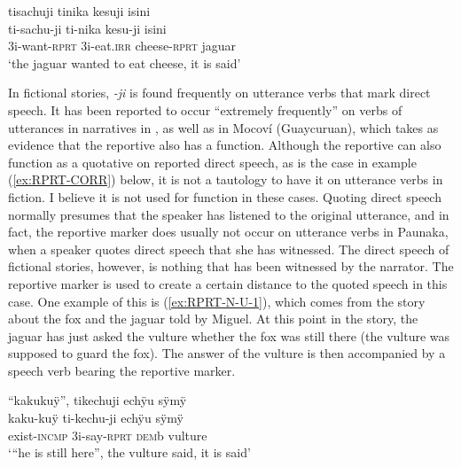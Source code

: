 \ea\label{ex:RPRT-N-2}
\begingl 
\glpreamble tisachuji tinika kesuji isini\\
\gla ti-sachu-ji ti-nika kesu-ji isini\\ 
\glb 3i-want-\textsc{rprt} 3i-eat.\textsc{irr} cheese-\textsc{rprt} jaguar\\ 
\glft ‘the jaguar wanted to eat cheese, it is said’
\trailingcitation{[rxx-n120511l-1.025]}
\xe


In fictional stories, \textit{-ji} is found frequently on utterance verbs that mark direct speech. It has been reported to occur “extremely frequently” on verbs of utterances in narratives in  \citep[377]{Danielsen2007}, as well as in Mocoví (Guaycuruan), which \citet[218]{Mueller2013} takes as evidence that the reportive also has a  function. Although the reportive can also function as a quotative on reported direct speech, as is the case in example (\ref{ex:RPRT-CORR}) below, it is not a tautology to have it on utterance verbs in fiction. I believe it is not used for  function in these cases. Quoting direct speech normally presumes that the speaker has listened to the original utterance, and in fact, the reportive marker does usually not occur on utterance verbs in Paunaka, when a speaker quotes direct speech that she has witnessed. The direct speech of fictional stories, however, is nothing that has been witnessed by the narrator. The reportive marker is used to create a certain distance to the quoted speech in this case. One example of this is (\ref{ex:RPRT-N-U-1}), which comes from the story about the fox and the jaguar told by Miguel. At this point in the story, the jaguar has just asked the vulture whether the fox was still there (the vulture was supposed to guard the fox). The answer of the vulture is then accompanied by a speech verb bearing the reportive marker.

\ea\label{ex:RPRT-N-U-1}
\begingl 
\glpreamble “kakukuÿ”, tikechuji echÿu sÿmÿ\\
\gla kaku-kuÿ ti-kechu-ji echÿu sÿmÿ \\ 
\glb exist-\textsc{incmp} 3i-say-\textsc{rprt} \textsc{dem}b vulture \\ 
\glft ‘“he is still here”, the vulture said, it is said’
\endgl
\trailingcitation{[jmx-n120429ls-x5.157]}
\xe


